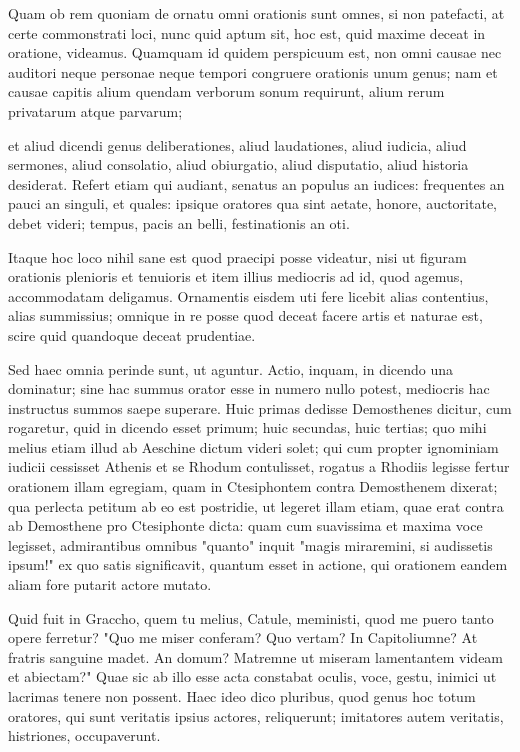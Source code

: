  Quam ob rem quoniam de ornatu omni orationis sunt omnes, si non patefacti, at certe commonstrati loci, nunc quid aptum sit, hoc est, quid maxime deceat in oratione, videamus. Quamquam id quidem perspicuum est, non omni causae nec auditori neque personae neque tempori congruere orationis unum genus; nam et causae capitis alium quendam verborum sonum requirunt, alium rerum privatarum atque parvarum;

 et aliud dicendi genus deliberationes, aliud laudationes, aliud iudicia, aliud sermones, aliud consolatio, aliud obiurgatio, aliud disputatio, aliud historia desiderat. Refert etiam qui audiant, senatus an populus an iudices: frequentes an pauci an singuli, et quales: ipsique oratores qua sint aetate, honore, auctoritate, debet videri; tempus, pacis an belli, festinationis an oti.

 Itaque hoc loco nihil sane est quod praecipi posse videatur, nisi ut figuram orationis plenioris et tenuioris et item illius mediocris ad id, quod agemus, accommodatam deligamus. Ornamentis eisdem uti fere licebit alias contentius, alias summissius; omnique in re posse quod deceat facere artis et naturae est, scire quid quandoque deceat prudentiae.

 Sed haec omnia perinde sunt, ut aguntur. Actio, inquam, in dicendo una dominatur; sine hac summus orator esse in numero nullo potest, mediocris hac instructus summos saepe superare. Huic primas dedisse Demosthenes dicitur, cum rogaretur, quid in dicendo esset primum; huic secundas, huic tertias; quo mihi melius etiam illud ab Aeschine dictum videri solet; qui cum propter ignominiam iudicii cessisset Athenis et se Rhodum contulisset, rogatus a Rhodiis legisse fertur orationem illam egregiam, quam in Ctesiphontem contra Demosthenem dixerat; qua perlecta petitum ab eo est postridie, ut legeret illam etiam, quae erat contra ab Demosthene pro Ctesiphonte dicta: quam cum suavissima et maxima voce legisset, admirantibus omnibus "quanto" inquit "magis miraremini, si audissetis ipsum!" ex quo satis significavit, quantum esset in actione, qui orationem eandem aliam fore putarit actore mutato.

 Quid fuit in Graccho, quem tu melius, Catule, meministi, quod me puero tanto opere ferretur? "Quo me miser conferam? Quo vertam? In Capitoliumne? At fratris sanguine madet. An domum? Matremne ut miseram lamentantem videam et abiectam?" Quae sic ab illo esse acta constabat oculis, voce, gestu, inimici ut lacrimas tenere non possent. Haec ideo dico pluribus, quod genus hoc totum oratores, qui sunt veritatis ipsius actores, reliquerunt; imitatores autem veritatis, histriones, occupaverunt.

